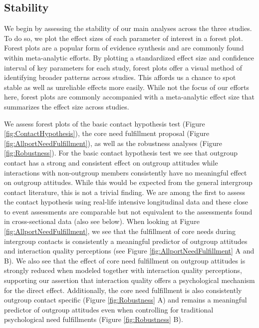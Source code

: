\subsection{Stability}

We begin by assessing the stability of our main analyses across the
three studies. To do so, we plot the effect sizes of each parameter of
interest in a forest plot. Forest plots are a popular form of evidence
synthesis and are commonly found within meta-analytic efforts. By
plotting a standardized effect size and confidence interval of key
parameters for each study, forest plots offer a visual method of
identifying broader patterns across studies. This affords us a chance to
spot stable as well as unreliable effects more easily. While not the
focus of our efforts here, forest plots are commonly accompanied with a
meta-analytic effect size that summarizes the effect size across
studies.

We assess forest plots of the basic contact hypothesis test (Figure
\ref{fig:ContactHypothesis}), the core need fulfillment proposal (Figure
\ref{fig:AllportNeedFulfillment}), as well as the robustness analyses
(Figure \ref{fig:Robustness}). For the basic contact hypothesis test we
see that outgroup contact has a strong and consistent effect on outgroup
attitudes while interactions with non-outgroup members consistently have
no meaningful effect on outgroup attitudes. While this would be expected
from the general intergroup contact literature, this is not a trivial
finding. We are among the first to assess the contact hypothesis using
real-life intensive longitudinal data and these close to event
assessments are comparable but not equivalent to the assessments found
in cross-sectional data (also see below). When looking at Figure
\ref{fig:AllportNeedFulfillment}, we see that the fulfillment of core
needs during intergroup contacts is consistently a meaningful predictor
of outgroup attitudes and interaction quality perceptions (see Figure
\ref{fig:AllportNeedFulfillment} A and B). We also see that the effect
of core need fulfillment on outgroup attitudes is strongly reduced when
modeled together with interaction quality perceptions, supporting our
assertion that interaction quality offers a psychological mechanism for
the direct effect. Additionally, the core need fulfillment is also
consistently outgroup contact specific (Figure \ref{fig:Robustness} A)
and remains a meaningful predictor of outgroup attitudes even when
controlling for traditional psychological need fulfillments (Figure
\ref{fig:Robustness} B).

